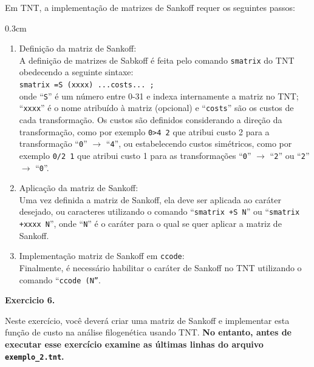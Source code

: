 \begin{refsection}
	Em TNT, a implementação de matrizes de Sankoff requer os seguintes passos:
\begin {myindentpar}{0.3cm}
\begin{enumerate}[\itshape 1.]
	\item{Definição da matriz de Sankoff:}\\
	A definição de matrizes de Sabkoff é feita pelo comando \texttt{smatrix} do TNT obedecendo a seguinte sintaxe:\\
\texttt{smatrix =S (xxxx) ...costs... ;}\\
onde ``\texttt{S}'' é um número entre 0-31 e indexa internamente a matriz no TNT; ``\texttt{xxxx}'' é o nome atribuído à matriz (opcional) e ``\texttt{costs}'' são os custos de cada transformação. Os custos são definidos considerando a direção da transformação, como por exemplo \texttt{0>4 2} que atribui custo 2 para a transformação ``\texttt{0}'' $\rightarrow$ ``\texttt{4}'', ou estabelecendo custos simétricos, como por exemplo \texttt{0/2  1} que atribui custo 1 para as transformações ``\texttt{0}'' $\rightarrow$ ``\texttt{2}'' ou ``\texttt{2}'' $\rightarrow$ ``\texttt{0}''. 

	\item{Aplicação da matriz de Sankoff:}\\
	Uma vez definida a matriz de Sankoff, ela deve ser aplicada ao caráter desejado, ou caracteres utilizando o comando ``\texttt{smatrix +S N}'' ou ``\texttt{smatrix +xxxx N}'', onde ``\texttt{N}'' é o caráter para o qual se quer aplicar a matriz de Sankoff.

	\item{Implementação matriz de Sankoff em \texttt{ccode}:}\\	
	Finalmente, é necessário habilitar o caráter de Sankoff no TNT utilizando o comando ``\texttt{ccode (N''}.

\end{enumerate}
\end{myindentpar}


\begin{blackBlock}{\textbf{Exercicio 6.}}\label{tut6:ex:6.1}

Neste exercício, você deverá criar uma matriz de Sankoff e implementar esta função de custo na análise filogenética usando TNT. \textbf{No entanto, antes de executar esse exercício examine as últimas linhas do arquivo \texttt{exemplo\_2.tnt}.}

\end{blackBlock}


\end{refsection}

